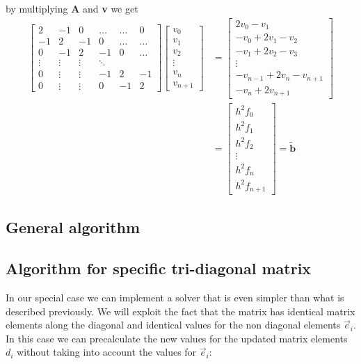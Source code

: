 \documentclass[norsk,a4paper,12pt]{article}
\begin{document}
by multiplying \textbf{A} and \textbf{v} we get \\
\begin{align*}
\begin{bmatrix} 2 & -1 & 0 & \dots & \dots & 0 \\ -1 & 2 & -1 & 0 & \dots & \dots \\ 0 & -1 & 2 & -1 & 0 & \dots \\ \vdots & \vdots & \vdots & \ddots \\ 0 & \vdots & \vdots & -1 & 2 & -1 \\ 0 & \vdots & \vdots & 0 & -1 & 2  \end{bmatrix}
\begin{bmatrix} v_0 \\ v_1\\ v_2\\ \vdots \\ v_n \\ v_{n+1} \end{bmatrix}&=\begin{bmatrix} 2v_0 - v_1 \\ -v_0+2v_1-v_2 \\ -v_1+2v_2-v_3 \\ \vdots \\ -v_{n-1}+2v_n-v_{n+1} \\ -v_n+2v_{n+1}
\end{bmatrix}\\&=
\begin{bmatrix}h^2f_0 \\ h^2f_1\\ h^2f_2\\ \vdots \\ h^2f_n\\ h^2f_{n+1}\end{bmatrix} = \widetilde{\textbf{b}}
\end{align*}

\subsection{General algorithm}

\subsection{Algorithm for specific tri-diagonal matrix}

In our special case we can implement a solver that is even simpler than what is described previously.  We will exploit the fact that the matrix has identical matrix elements along the diagonal and identical values for the non diagonal elements $\vec{e}_i$. In this case we can precalculate the new values for the updated matrix elements $d_i$ without taking into account the values for $\vec{e}_i$:
\end{document}
